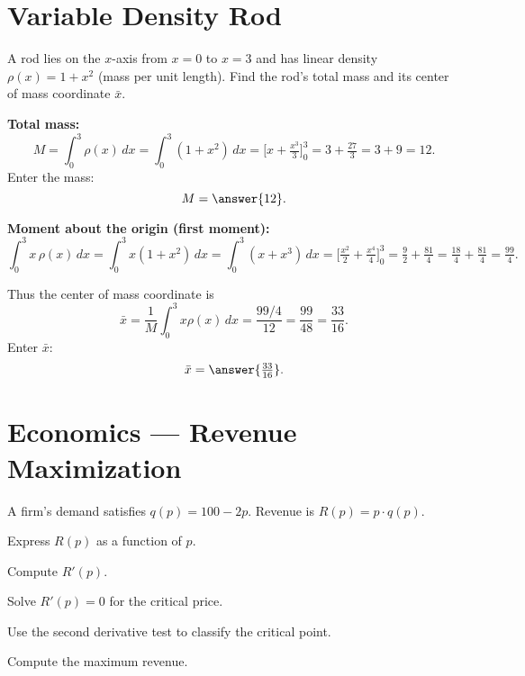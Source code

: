 \documentclass{ximera}
\begin{document}
\section{Variable Density Rod}

\begin{problem}
A rod lies on the $x$-axis from $x=0$ to $x=3$ and has linear density $\rho(x)=1+x^2$ (mass per unit length). Find the rod's total mass and its center of mass coordinate $\bar x$.
\end{problem}

\begin{solution}
\textbf{Total mass:}
\[
M=\int_0^3 \rho(x)\,dx = \int_0^3 (1+x^2)\,dx
= \Big[x+\tfrac{x^3}{3}\Big]_0^3 = 3 + \tfrac{27}{3} = 3+9 = 12.
\]
Enter the mass:
\[
M=\answer{12}.
\]

\textbf{Moment about the origin (first moment):}
\[
\int_0^3 x\,\rho(x)\,dx = \int_0^3 x(1+x^2)\,dx
= \int_0^3 (x + x^3)\,dx
= \Big[\tfrac{x^2}{2} + \tfrac{x^4}{4}\Big]_0^3
= \tfrac{9}{2} + \tfrac{81}{4} = \tfrac{18}{4} + \tfrac{81}{4} = \tfrac{99}{4}.
\]

Thus the center of mass coordinate is
\[
\bar x = \frac{1}{M}\int_0^3 x\rho(x)\,dx = \frac{99/4}{12} = \frac{99}{48} = \frac{33}{16}.
\]
Enter $\bar x$:
\[
\bar x=\answer{\tfrac{33}{16}}.
\]
\end{solution}

\section{Economics — Revenue Maximization}

\begin{problem}
A firm's demand satisfies \(q(p)=100-2p\). Revenue is \(R(p)=p\cdot q(p)\).

Express \(R(p)\) as a function of \(p\).

Compute \(R'(p)\).

Solve \(R'(p)=0\) for the critical price.

Use the second derivative test to classify the critical point.

Compute the maximum revenue.
\end{problem}
\end{document}
